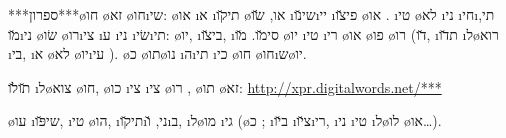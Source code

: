 ***ספרון***\o{חו} \o{זא} \o{חו}\i{שי}:  \o{או}  \i{א} \i{תי}\u{קו} \o{או}, \u{שׂו}  \i{שי}\u{נו}\i{יי} \i{פי}\u{צו} \o{או} .  \i{טי} \o{לא} \i{ני} \i{חי}\i{תי},   \u{מו}\i{ני} \o{שׂו}   \o{רו}\i{צי} \i{ע}  \i{ני} \i{שׂי}\i{תי}: \o{יו}, \i{בי}\u{צו}, \i{סי}\u{מו}.  \u{מו}    \o{יו} \i{טי} \i{רי} \o{או} \o{פו} \o{רו} (\u{דו}, \i{ת}\u{דו} \i{ל}\o{רוא} \i{בי}, \i{א}  \o{לא} \o{יו}\i{עי} ).  \o{כ} \o{תו}\o{נו} \i{ה}\i{תי}   \i{כי}  \o{חו}  \o{חו}\i{ש}\o{יו}.

\u{תו}\u{לו} \i{ל}\o{צוא}  \o{חו}, \o{כו} \i{צי}  \i{צי} \o{רו} , \o{תו} \o{זא}: \url{http://xpr.digitalwords.net/***}

  \o{עו} \i{שי}\u{פּו}, \i{טי} \o{הו}, \i{תי}\u{קו}\i{ני}, \u{ו}\i{ב},  \i{ל}\o{מו}     \i{גי} (\o{כ} ; \i{ב}\u{יו}   \i{צ}\u{יו}\i{רי}, \i{ני} \i{טי}{\gnuvah} \i{ל}\o{לו} \o{או}…).

